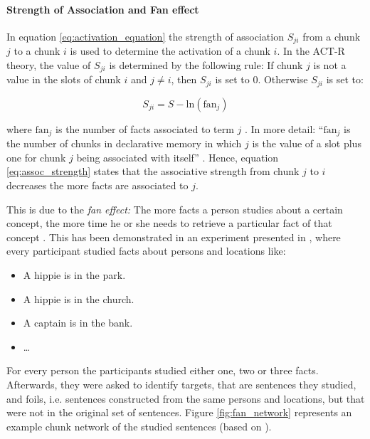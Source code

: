 \paragraph{Strength of Association and Fan effect}
\label{actr:fan_effect}

In equation \eqref{eq:activation_equation} the strength of association $S_{ji}$ from a chunk $j$ to a chunk $i$ is used to determine the activation of a chunk $i$.  In the ACT-R theory, the value of $S_{ji}$ is determined by the following rule: If chunk $j$ is not a value in the slots of chunk $i$ and $j \neq i$, then $S_{ji}$ is set to 0. Otherwise $S_{ji}$ is set to: 

\begin{equation}
\label{eq:assoc_strength}
S_{ji} = S - \mathrm{ln}(\mathrm{fan}_j)
\end{equation}

where $\mathrm{fan}_j$ is the number of facts associated to term $j$ \cite[1042]{anderson_implications_2000}. In more detail: ``$\mathrm{fan}_j$ is the number of chunks in declarative memory in which $j$ is the value of a slot plus one for chunk $j$ being associated with itself'' \cite[unit 5, p. 2]{actr_tutorial}. Hence, equation \eqref{eq:assoc_strength} states that the associative strength from chunk $j$ to $i$ decreases the more facts are associated to $j$.

This is due to the \emph{fan effect:} The more facts a person studies about a certain concept, the more time he or she needs to retrieve a particular fact of that concept \cite[186]{anderson_fan_1999}. This has been demonstrated in an experiment presented in \cite{anderson_fan_1999}, where every participant studied facts about persons and locations like:

\begin{itemize}
 \item A hippie is in the park.
 \item A hippie is in the church.
 \item A captain is in the bank.
 \item \dots
\end{itemize}

For every person the participants studied either one, two or three facts. Afterwards, they were asked to identify targets, that are sentences they studied, and foils, i.e. sentences constructed from the same persons and locations, but that were not in the original set of sentences. Figure \ref{fig:fan_network} represents an example chunk network of the studied sentences (based on \cite[fig.~1]{anderson_fan_1999}).

